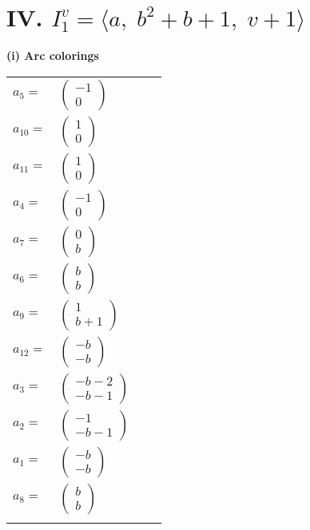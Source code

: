 \documentclass[1p]{elsarticle_modified}
\theoremstyle{definition}
\begin{document}
\centering \section*{IV. $I^v_{1}= \langle a,\;b^2+b+1,\;v+1 \rangle$}
\flushleft \textbf{(i) Arc colorings}\\
\begin{tabular}{m{7pt} m{180pt} m{7pt} m{180pt} }
\flushright $a_{5}=$&$\begin{pmatrix}-1\\0\end{pmatrix}$ \\
\flushright $a_{10}=$&$\begin{pmatrix}1\\0\end{pmatrix}$ \\
\flushright $a_{11}=$&$\begin{pmatrix}1\\0\end{pmatrix}$ \\
\flushright $a_{4}=$&$\begin{pmatrix}-1\\0\end{pmatrix}$ \\
\flushright $a_{7}=$&$\begin{pmatrix}0\\b\end{pmatrix}$ \\
\flushright $a_{6}=$&$\begin{pmatrix}b\\b\end{pmatrix}$ \\
\flushright $a_{9}=$&$\begin{pmatrix}1\\b+1\end{pmatrix}$ \\
\flushright $a_{12}=$&$\begin{pmatrix}- b\\- b\end{pmatrix}$ \\
\flushright $a_{3}=$&$\begin{pmatrix}- b-2\\- b-1\end{pmatrix}$ \\
\flushright $a_{2}=$&$\begin{pmatrix}-1\\- b-1\end{pmatrix}$ \\
\flushright $a_{1}=$&$\begin{pmatrix}- b\\- b\end{pmatrix}$ \\
\flushright $a_{8}=$&$\begin{pmatrix}b\\b\end{pmatrix}$\\&\end{tabular}
\end{document}

